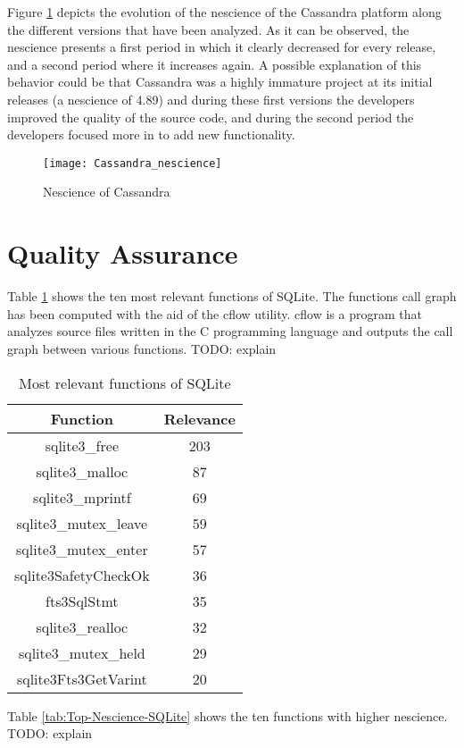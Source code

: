 Figure \ref{fig:Nescience-of-Cassandra} depicts the evolution of the nescience of the Cassandra platform along the different versions that have been analyzed. As it can be observed, the nescience presents a first period in which it clearly decreased for every release, and a second period where it increases again. A possible explanation of this behavior could be that Cassandra was a highly immature project at its initial releases (a nescience of 4.89) and during these first versions the developers improved the quality of the source code, and during the second period the developers focused more in to add new functionality.

\begin{figure}[h]
\centering\texttt{[image: Cassandra\_nescience]}
\caption{\label{fig:Nescience-of-Cassandra}Nescience of Cassandra}
\end{figure}

\section{Quality Assurance}

Table \ref{tab:Top-Relevance-SQLite} shows the ten most relevant functions of SQLite. The functions call graph has been computed with the aid of the cflow utility. cflow is a program that analyzes source files written in the C programming language and outputs the call graph between various functions. {\color{red} TODO: explain}

\begin{table}
\begin{centering}
\begin{tabular}{|c|c|}
\hline 
Function & Relevance \tabularnewline
\hline 
\hline
sqlite3\_free & 203 \tabularnewline
sqlite3\_malloc & 87 \tabularnewline
sqlite3\_mprintf & 69 \tabularnewline
sqlite3\_mutex\_leave & 59 \tabularnewline
sqlite3\_mutex\_enter & 57 \tabularnewline
sqlite3SafetyCheckOk & 36 \tabularnewline
fts3SqlStmt & 35 \tabularnewline
sqlite3\_realloc & 32 \tabularnewline
sqlite3\_mutex\_held & 29 \tabularnewline
sqlite3Fts3GetVarint & 20 \tabularnewline
\hline
\end{tabular}
\par\end{centering}
\caption{\label{tab:Top-Relevance-SQLite}Most relevant functions of SQLite}
\end{table}

Table \ref{tab:Top-Nescience-SQLite} shows the ten functions with higher nescience. {\color{red} TODO: explain}

